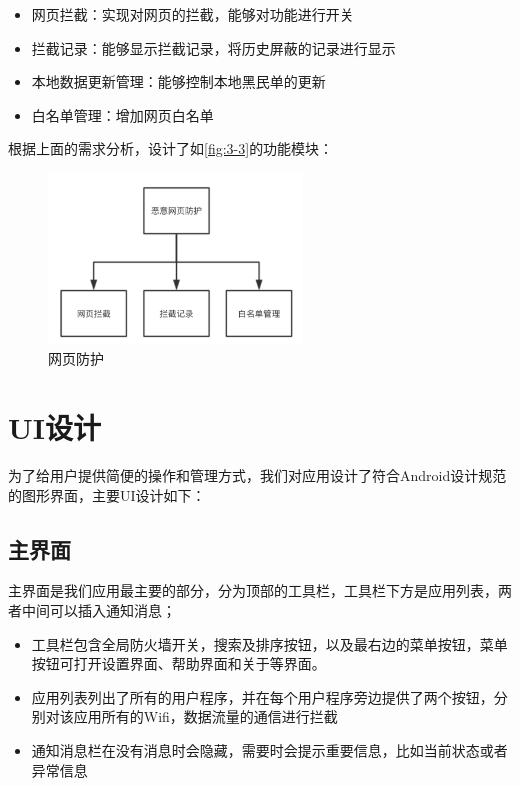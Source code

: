 \documentclass[format=final, language=chinese, degree=fyp]{hustthesis}
\begin{document}
\begin{itemize}
    \item 网页拦截：实现对网页的拦截，能够对功能进行开关
    \item 拦截记录：能够显示拦截记录，将历史屏蔽的记录进行显示
    \item 本地数据更新管理：能够控制本地黑民单的更新
    \item 白名单管理：增加网页白名单
\end{itemize}

根据上面的需求分析，设计了如\autoref{fig:3-3}的功能模块：
\begin{figure}[!h]
	\centering
	\includegraphics[width=0.6\textwidth]{function_3.png}
	\caption{网页防护}\label{fig:3-3}
\end{figure}

\section{UI设计}


为了给用户提供简便的操作和管理方式，我们对应用设计了符合Android设计规范的图形界面，主要UI设计如下：

\subsection{主界面}

主界面是我们应用最主要的部分，分为顶部的工具栏，工具栏下方是应用列表，两者中间可以插入通知消息；
\begin{itemize}
    \item 工具栏包含全局防火墙开关，搜索及排序按钮，以及最右边的菜单按钮，菜单按钮可打开设置界面、帮助界面和关于等界面。
    \item 应用列表列出了所有的用户程序，并在每个用户程序旁边提供了两个按钮，分别对该应用所有的Wifi，数据流量的通信进行拦截
    \item 通知消息栏在没有消息时会隐藏，需要时会提示重要信息，比如当前状态或者异常信息
\end{itemize}
\end{document}
